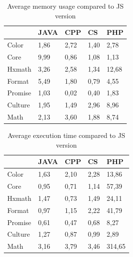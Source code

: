 \begin{table}[]
	\centering

	\begin{tabular}{|l|l|l|l|l|}
		\hline
		& JAVA & CPP  & CS   & PHP   \\ \hline
		Color   & 1,86 & 2,72 & 1,40 & 2,78  \\ \hline
		Core    & 9,99 & 0,86 & 1,08 & 1,13  \\ \hline
		Hxmath  & 3,26 & 2,58 & 1,34 & 12,68 \\ \hline
		Format  & 5,49 & 1,80 & 0,79 & 4,55  \\ \hline
		Promise & 1,03 & 0,02 & 0,40 & 1,83  \\ \hline
		Culture & 1,95 & 1,49 & 2,96 & 8,96  \\ \hline
		Math    & 2,13 & 3,60 & 1,88 & 8,74  \\ \hline
	\end{tabular}
		\caption{Average memory usage compared to JS version}
		\label{my-label}
\end{table}
\begin{table}[]
	\centering

	\begin{tabular}{|l|l|l|l|l|}
		\hline
		& JAVA & CPP  & CS   & PHP    \\ \hline
		Color   & 1,63 & 2,10 & 2,28 & 13,86  \\ \hline
		Core    & 0,95 & 0,71 & 1,14 & 57,39  \\ \hline
		Hxmath  & 1,47 & 0,73 & 1,49 & 24,11  \\ \hline
		Format  & 0,97 & 1,15 & 2,22 & 41,79  \\ \hline
		Promise & 0,61 & 0,47 & 0,68 & 8,27   \\ \hline
		Culture & 1,27 & 0,87 & 0,99 & 2,89   \\ \hline
		Math    & 3,16 & 3,79 & 3,46 & 314,65 \\ \hline
	\end{tabular}
		\caption{Average execution time compared to JS version}
		\label{my-label}
\end{table}

